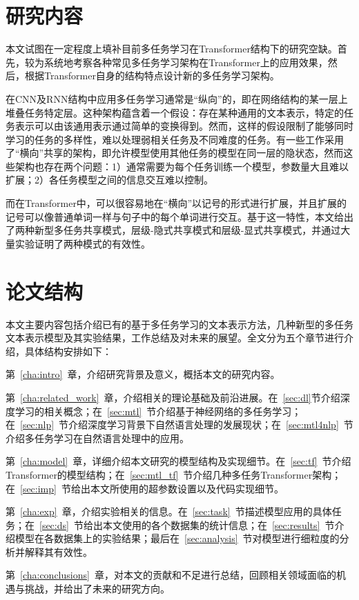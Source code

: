 \section{研究内容}

本文试图在一定程度上填补目前多任务学习在Transformer结构下的研究空缺。首先，较为系统地考察各种常见多任务学习架构在Transformer上的应用效果，然后，根据Transformer自身的结构特点设计新的多任务学习架构。

在CNN及RNN结构中应用多任务学习通常是“纵向”的，即在网络结构的某一层上堆叠任务特定层\cite{DBLP:conf/acl/SogaardG16}\cite{DBLP:conf/ijcai/ZhengCQ18}。这种架构蕴含着一个假设：存在某种通用的文本表示，特定的任务表示可以由该通用表示通过简单的变换得到。然而，这样的假设限制了能够同时学习的任务的多样性，难以处理弱相关任务及不同难度的任务。有一些工作采用了“横向”共享的架构，即允许模型使用其他任务的模型在同一层的隐状态\cite{DBLP:conf/ijcai/LiuQH16}\cite{DBLP:conf/cvpr/MisraSGH16}\cite{1705.08142}，然而这些架构也存在两个问题：1）通常需要为每个任务训练一个模型，参数量大且难以扩展；2）各任务模型之间的信息交互难以控制。

而在Transformer中，可以很容易地在“横向”以记号的形式进行扩展，并且扩展的记号可以像普通单词一样与句子中的每个单词进行交互。基于这一特性，本文给出了两种新型多任务共享模式，层级-隐式共享模式和层级-显式共享模式，并通过大量实验证明了两种模式的有效性。

\section{论文结构}

本文主要内容包括介绍已有的基于多任务学习的文本表示方法，几种新型的多任务文本表示模型及其实验结果，工作总结及对未来的展望。全文分为五个章节进行介绍，具体结构安排如下：

第~\ref{cha:intro}~章，介绍研究背景及意义，概括本文的研究内容。

第~\ref{cha:related_work}~章，介绍相关的理论基础及前沿进展。在~\ref{sec:dl}节介绍深度学习的相关概念；在~\ref{sec:mtl}~节介绍基于神经网络的多任务学习；在~\ref{sec:nlp}~节介绍深度学习背景下自然语言处理的发展现状；在~\ref{sec:mtl4nlp}~节介绍多任务学习在自然语言处理中的应用。

第~\ref{cha:model}~章，详细介绍本文研究的模型结构及实现细节。在~\ref{sec:tf}~节介绍Transformer的模型结构；在~\ref{sec:mtl_tf}~节介绍几种多任务Transformer架构；在~\ref{sec:imp}~节给出本文所使用的超参数设置以及代码实现细节。

第~\ref{cha:exp}~章，介绍实验相关的信息。在~\ref{sec:task}~节描述模型应用的具体任务；在~\ref{sec:ds}~节给出本文使用的各个数据集的统计信息；在~\ref{sec:results}~节介绍模型在各数据集上的实验结果；最后在~\ref{sec:analysis}~节对模型进行细粒度的分析并解释其有效性。

第~\ref{cha:conclusions}~章，对本文的贡献和不足进行总结，回顾相关领域面临的机遇与挑战，并给出了未来的研究方向。

